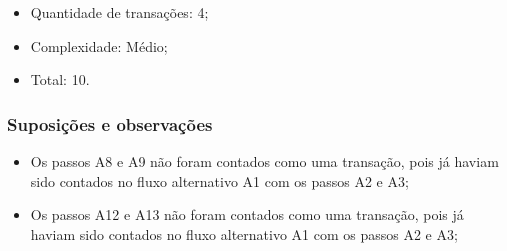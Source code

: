   \begin{itemize}
  \item Quantidade de transações: 4;
  \item Complexidade: Médio;
  \item Total: 10.
  \end{itemize}
  
  \subsubsection{Suposições e observações}
  
  \begin{itemize}   
   \item Os passos A8 e A9 não foram contados como uma transação, pois já haviam sido contados no fluxo alternativo
      A1 com os passos A2 e A3;
   \item Os passos A12 e A13 não foram contados como uma transação, pois já haviam sido contados no fluxo alternativo
      A1 com os passos A2 e A3;
  \end{itemize}

  \vfill